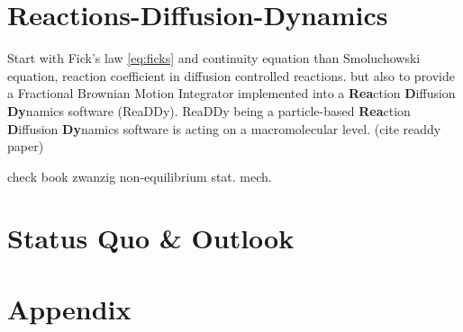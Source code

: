 \documentclass[
  a4paper,BCOR10mm,oneside,
  bibtotoc,idxtotoc,
  headsepline,footsepline,%
  fleqn,openbib
]{scrbook}
\begin{document}
\chapter{Reactions-Diffusion-Dynamics}

Start with Fick's law \cref{eq:ficks} and continuity equation than Smoluchowski equation, reaction coefficient in diffusion controlled reactions.
 but also to provide a Fractional Brownian Motion Integrator implemented into a \textbf{Rea}ction \textbf{D}iffusion \textbf{Dy}namics software (ReaDDy). ReaDDy being a particle-based \textbf{Rea}ction \textbf{D}iffusion \textbf{Dy}namics software is acting on a macromolecular level. (cite readdy paper)
 
 check book zwanzig non-equilibrium stat. mech.
 
\chapter{Status Quo \& Outlook}
\chapter{Appendix}
\end{document}
